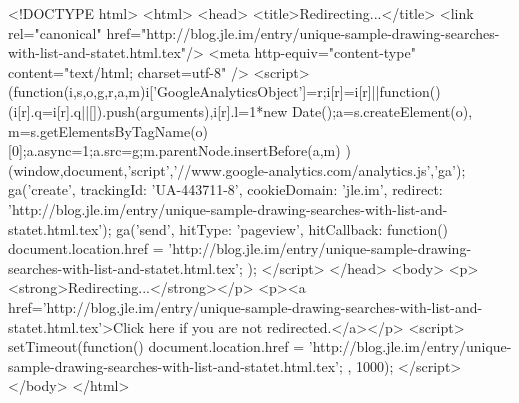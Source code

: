 <!DOCTYPE html>
<html>
<head>
<title>Redirecting...</title>
<link rel="canonical" href="http://blog.jle.im/entry/unique-sample-drawing-searches-with-list-and-statet.html.tex"/>
<meta http-equiv="content-type" content="text/html; charset=utf-8" />
<script>
(function(i,s,o,g,r,a,m){i['GoogleAnalyticsObject']=r;i[r]=i[r]||function(){
(i[r].q=i[r].q||[]).push(arguments)},i[r].l=1*new Date();a=s.createElement(o),
m=s.getElementsByTagName(o)[0];a.async=1;a.src=g;m.parentNode.insertBefore(a,m)
})(window,document,'script','//www.google-analytics.com/analytics.js','ga');
ga('create', { trackingId: 'UA-443711-8', cookieDomain: 'jle.im', redirect: 'http://blog.jle.im/entry/unique-sample-drawing-searches-with-list-and-statet.html.tex'});
ga('send', { hitType: 'pageview', hitCallback: function() { document.location.href = 'http://blog.jle.im/entry/unique-sample-drawing-searches-with-list-and-statet.html.tex'; } });
</script>
</head>
<body>
  <p><strong>Redirecting...</strong></p>
  <p><a href='http://blog.jle.im/entry/unique-sample-drawing-searches-with-list-and-statet.html.tex'>Click here if you are not redirected.</a></p>
  <script>
    setTimeout(function() { document.location.href = 'http://blog.jle.im/entry/unique-sample-drawing-searches-with-list-and-statet.html.tex'; }, 1000);
  </script>
</body>
</html>
